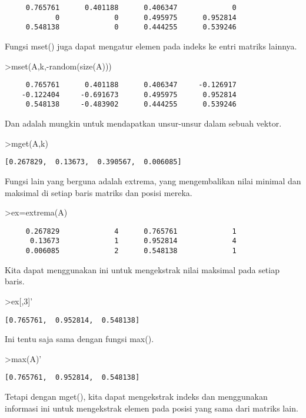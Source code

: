 \documentclass[
]{book}
\begin{document}
\begin{verbatim}
     0.765761      0.401188      0.406347             0 
            0             0      0.495975      0.952814 
     0.548138             0      0.444255      0.539246 
\end{verbatim}

Fungsi mset() juga dapat mengatur elemen pada indeks ke entri matriks lainnya.

\textgreater mset(A,k,-random(size(A)))

\begin{verbatim}
     0.765761      0.401188      0.406347     -0.126917 
    -0.122404     -0.691673      0.495975      0.952814 
     0.548138     -0.483902      0.444255      0.539246 
\end{verbatim}

Dan adalah mungkin untuk mendapatkan unsur-unsur dalam sebuah vektor.

\textgreater mget(A,k)

\begin{verbatim}
[0.267829,  0.13673,  0.390567,  0.006085]
\end{verbatim}

Fungsi lain yang berguna adalah extrema, yang mengembalikan nilai minimal dan maksimal di setiap baris matriks dan posisi mereka.

\textgreater ex=extrema(A)

\begin{verbatim}
     0.267829             4      0.765761             1 
      0.13673             1      0.952814             4 
     0.006085             2      0.548138             1 
\end{verbatim}

Kita dapat menggunakan ini untuk mengekstrak nilai maksimal pada setiap baris.

\textgreater ex{[},3{]}'

\begin{verbatim}
[0.765761,  0.952814,  0.548138]
\end{verbatim}

Ini tentu saja sama dengan fungsi max().

\textgreater max(A)'

\begin{verbatim}
[0.765761,  0.952814,  0.548138]
\end{verbatim}

Tetapi dengan mget(), kita dapat mengekstrak indeks dan menggunakan informasi ini untuk mengekstrak elemen pada posisi yang sama dari matriks lain.
\end{document}
